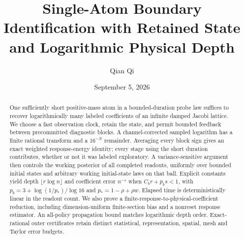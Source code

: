 \documentclass[11pt,reqno]{amsart}
\title[Single-atom boundary identification]{Single-Atom Boundary Identification with Retained State and Logarithmic Physical Depth}
\author{Qian Qi}
\date{September 5, 2026}
\theoremstyle{remark}\newtheorem{remark}[theorem]{Remark}
\begin{document}
\begin{abstract}
One sufficiently short positive-mass atom in a bounded-duration probe law
suffices to recover logarithmically many labeled coefficients of an infinite
damped Jacobi lattice. We choose a fast observation clock, retain the state,
and permit bounded feedback between precommitted diagnostic blocks. A
channel-corrected sampled logarithm has a finite rational transform and a
$16^{-N}$ remainder. Averaging every block sign gives an exact weighted
response-energy identity; every stage using the short duration contributes,
whether or not it was labeled exploratory. A variance-sensitive argument
then controls the working posterior of all completed readouts, uniformly over
bounded initial states and arbitrary working initial-state laws on that ball.
Explicit constants yield depth $\lfloor r\log n\rfloor$ and coefficient error
$n^{-s}$ when $C_b r+p_b s<1$, with $p_b=3+\log(1/p_*)/\log16$ and
$p_*=1-\rho+\rho w$. Elapsed time is deterministically linear in the readout
count. We also prove a finite-response-to-physical-coefficient reduction,
including dimension-uniform finite-section bias and a nonreset response
estimator. An all-policy propagation bound matches logarithmic depth order.
Exact-rational outer certificates retain distinct statistical, representation,
spatial, mesh and Taylor error budgets.
\end{abstract}
\maketitle
\tableofcontents









\end{document}
